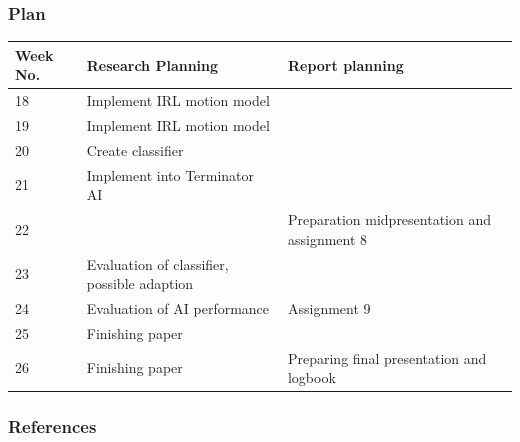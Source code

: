 \documentclass{beamer}
\begin{document}
        \begin{frame}
            \frametitle{Plan}
            \begin{table}
                \centering
                \begin{tabular}{|l|p{5cm}|p{4cm}|}
                    \hline                        
                    Week No. & Research Planning & Report planning \\
                    \hline
                    \hline
                    18 &  Implement IRL motion model& \\
                    \hline
                    19 &  Implement IRL motion model& \\
                    \hline
                    20 &  Create classifier&\\
                    \hline
                    21 &  Implement into Terminator AI& \\
                    \hline
                    22 & & Preparation midpresentation and assignment 8\\
                    \hline
                    23 &  Evaluation of classifier, possible adaption&\\
                    \hline
                    24 &  Evaluation of AI performance & Assignment 9 \\
                    \hline
                    25 &  Finishing paper & \\
                    \hline
                    26 & Finishing paper & Preparing final presentation and logbook \\
                    \hline
                \end{tabular}
            \end{table}
        \end{frame}


\begin{frame}
    \frametitle{References}

\end{frame}
        
\end{document}
